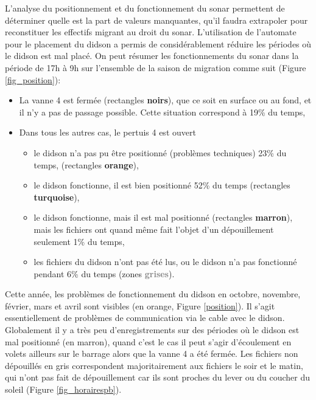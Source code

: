 \documentclass[11pt,twocolumn,titlepage,twoside]{article}
\begin{document}
L'analyse du positionnement et du fonctionnement du sonar permettent de
déterminer quelle est la part de valeurs manquantes, qu'il faudra extrapoler pour
reconstituer les effectifs migrant au droit du sonar. L'utilisation de
l'automate pour le placement du didson a permis de considérablement réduire les
périodes où le didson est mal placé.  On peut résumer les fonctionnements du
sonar dans la période de 17h à 9h sur l'ensemble de la saison de migration comme suit (Figure \ref{fig_position}):
\begin{itemize}
  \item
      La vanne 4 est fermée (rectangles \textbf{noirs}),
      que ce soit en surface ou au fond, et il n'y a pas de passage possible.
      Cette situation correspond à
      \num[round-mode = places,
round-precision = 1]{19}\% du temps,

  \item Dans tous les autres cas, le pertuis 4 est ouvert
  \begin{itemize}
  \item 
      le didson n'a pas pu être positionné (problèmes techniques)
      \num[round-mode = places,
round-precision = 1]{23}\% du temps, (rectangles
      \textbf{\textcolor{orange_EV}{orange}}),
  \item
      le  didson fonctionne, il est bien positionné
      \num[round-mode = places,
round-precision = 1]{52}\% du temps (rectangles
        \textbf{\textcolor{turquoise_EV}{turquoise}}),
  \item
      le didson fonctionne, mais il est mal positionné (rectangles
      \textbf{\textcolor{rouille}{marron}}), mais les fichiers ont quand même
      fait l'objet d'un dépouillement seulement \num[round-mode = places,
round-precision = 1]{1}\% du temps,
   \item  
      les fichiers du didson n'ont pas été lus, ou le didson n'a pas
      fonctionné pendant \num[round-mode = places,
round-precision = 1]{6}\% du
      temps (zones \textbf{\textcolor{Gray}{grises}}).
 \end{itemize}
\end{itemize}
Cette année, les problèmes de fonctionnement du didson en octobre, novembre,
février, mars et avril sont visibles (en orange, Figure \ref{position}). 
Il s'agit essentiellement de problèmes de communication via le
cable avec le didson. Globalement il y a très peu d'enregistrements sur des
périodes où le didson est mal positionné (en marron), quand c'est le cas il
peut s'agir d'écoulement en volets ailleurs sur le barrage alors que la vanne 4
a été fermée. 
Les fichiers non dépouillés en gris correspondent majoritairement aux fichiers
le soir et le matin, qui n'ont pas fait de dépouillement car ils sont proches du
lever ou du coucher du soleil (Figure \ref{fig_horairespb}).\\
\end{document}
